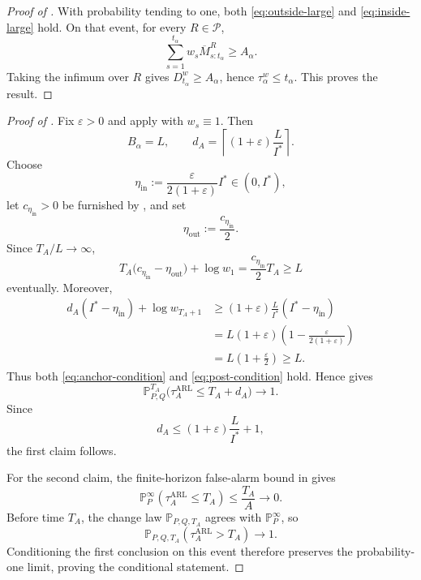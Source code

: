 \documentclass[12pt]{article}
\theoremstyle{spaced}
\theoremstyle{remark}
\newcommand{\calP}{\mathcal P}
\newcommand{\eps}{\varepsilon}
\newcommand{\Pinf}[1]{\mathbb P_{#1}^{\infty}}
\newcommand{\Pchg}[3]{\mathbb P_{#1,#2,#3}}
\begin{document}
\begin{proof}[Proof of ]
With probability tending to one, both
\eqref{eq:outside-large} and \eqref{eq:inside-large} hold.  On that
event, for every $R\in\calP$,
\[
  \sum_{s=1}^{t_\alpha}
  w_s\overline M_{s:t_\alpha}^R
  \ge A_\alpha.
\]
Taking the infimum over $R$ gives
$D_{t_\alpha}^w\ge A_\alpha$, hence
$\tau_\alpha^w\le t_\alpha$.  This proves the result.
\end{proof}



\begin{proof}[Proof of ]
Fix $\eps>0$ and apply  with
$w_s\equiv1$. Then
\[
    B_\alpha=L,
    \qquad
    d_A=\left\lceil(1+\eps)\frac{L}{I^*}\right\rceil .
\]
Choose
\[
    \eta_{\mathrm{in}}
    :=
    \frac{\eps}{2(1+\eps)}I^*
    \in(0,I^*),
\]
let $c_{\eta_{\mathrm{in}}}>0$ be furnished by
, and set
\[
    \eta_{\mathrm{out}}
    :=
    \frac{c_{\eta_{\mathrm{in}}}}{2}.
\]
Since $T_A/L\to\infty$,
\[
    T_A
    \bigl(c_{\eta_{\mathrm{in}}}-\eta_{\mathrm{out}}\bigr)
    +\log w_1
    =
    \frac{c_{\eta_{\mathrm{in}}}}{2}T_A
    \ge L
\]
eventually. Moreover,
\begin{align*}
    d_A(I^*-\eta_{\mathrm{in}})
    +\log w_{T_A+1}
    &\ge
    (1+\eps)\frac{L}{I^*}
    (I^*-\eta_{\mathrm{in}})\\
    &=
    L(1+\eps)
    \left(1-\frac{\eps}{2(1+\eps)}\right)\\
    &=
    L\left(1+\frac{\eps}{2}\right)
    \ge L.
\end{align*}
Thus both \eqref{eq:anchor-condition} and
\eqref{eq:post-condition} hold. Hence
 gives
\[
    \mathbb P_{P,Q}^{T_A}
    \bigl(\tau_A^{\mathrm{ARL}}\le T_A+d_A\bigr)
    \to1.
\]
Since
\[
    d_A
    \le
    (1+\eps)\frac{L}{I^*}+1,
\]
the first claim follows.

For the second claim, the finite-horizon false-alarm bound in
 gives
\[
    \Pinf{P}(\tau_A^{\mathrm{ARL}}\le T_A)
    \le \frac{T_A}{A}\to0.
\]
Before time $T_A$, the change law $\Pchg{P}{Q}{T_A}$ agrees with
$\Pinf{P}$, so
\[
    \Pchg{P}{Q}{T_A}
    (\tau_A^{\mathrm{ARL}}>T_A)\to1.
\]
Conditioning the first conclusion on this event therefore preserves
the probability-one limit, proving the conditional statement.
\end{proof}
\end{document}
